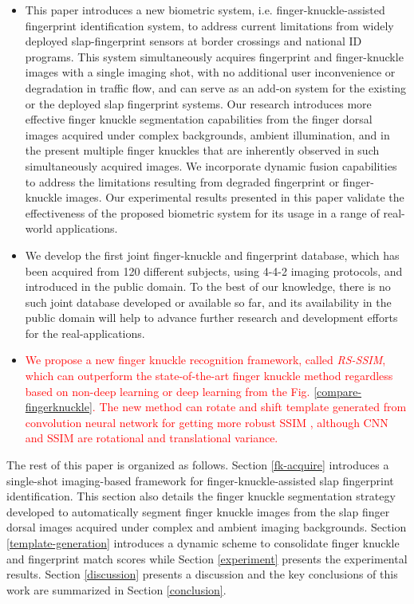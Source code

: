 \begin{itemize}
    \item This paper introduces a new biometric system, i.e. finger-knuckle-assisted fingerprint identification system, to address current limitations from widely deployed slap-fingerprint sensors at border crossings and national ID programs. This system simultaneously acquires fingerprint and finger-knuckle images with a single imaging shot, with no additional user inconvenience or degradation in traffic flow, and can serve as an add-on system for the existing or the deployed slap fingerprint systems. Our research introduces more effective finger knuckle segmentation capabilities from the finger dorsal images acquired under complex backgrounds, ambient illumination, and in the present multiple finger knuckles that are inherently observed in such simultaneously acquired images. We incorporate dynamic fusion capabilities to address the limitations resulting from degraded fingerprint or finger-knuckle images. Our experimental results presented in this paper validate the effectiveness of the proposed biometric system for its usage in a range of real-world applications. 
    \item We develop the first joint finger-knuckle and fingerprint database, which has been acquired from 120 different subjects, using 4-4-2 imaging protocols, and introduced in the public domain. To the best of our knowledge, there is no such joint database developed or available so far, and its availability in the public domain will help to advance further research and development efforts for the real-applications. 
    \item \textcolor{red}{We propose a new finger knuckle recognition framework, called \textit{RS-SSIM}, which can outperform the state-of-the-art finger knuckle method regardless based on non-deep learning or deep learning from the Fig. \ref{compare-fingerknuckle}. The new method can rotate and shift template generated from convolution neural network for getting more robust SSIM \cite{wang2004image}, although CNN and SSIM are rotational and translational variance.} 
\end{itemize}


The rest of this paper is organized as follows. Section \ref{fk-acquire} introduces a single-shot imaging-based framework for finger-knuckle-assisted slap fingerprint identification. This section also details the finger knuckle segmentation strategy developed to automatically segment finger knuckle images from the slap finger dorsal images acquired under complex and ambient imaging backgrounds. Section \ref{template-generation} introduces a dynamic scheme to consolidate finger knuckle and fingerprint match scores while Section \ref{experiment} presents the experimental results. Section \ref{discussion} presents a discussion and the key conclusions of this work are summarized in Section \ref{conclusion}.
